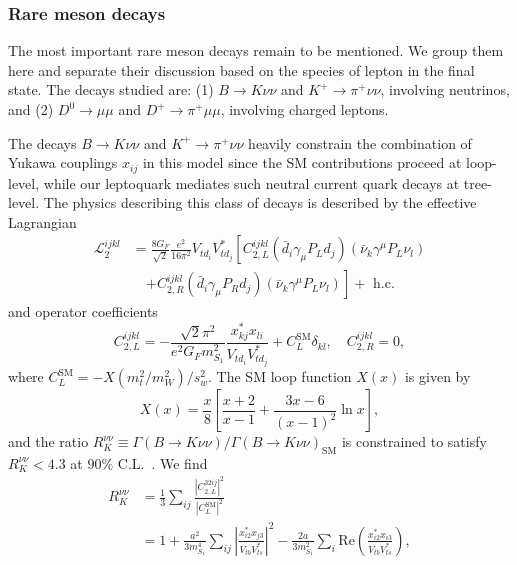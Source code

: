 \subsubsection{Rare meson decays}
\label{sec:ch3-raremesondecays}

The most important rare meson decays remain to be mentioned. We group them here
and separate their discussion based on the species of lepton in the final state.
The decays studied are: (1) $B \to K \nu \nu$ and $K^+ \to \pi^+ \nu \nu$,
involving neutrinos, and (2) $D^0 \to \mu \mu$ and $D^+ \to \pi^+ \mu \mu$,
involving charged leptons.

The decays $B \rightarrow K \nu \nu$ and $K^+ \rightarrow \pi^+ \nu \nu$ heavily
constrain the combination of Yukawa couplings $x_{ij}$ in this model since the
SM contributions proceed at loop-level, while our leptoquark mediates such
neutral current quark decays at tree-level. The physics describing this class of
decays is described by the effective Lagrangian~\cite{Altmannshofer:2009ma,
  Buras:2004uu}
\begin{equation}
  \begin{split}
    \mathscr{L}_2^{i j k l}
    &= \frac{8 G_F}{\sqrt{2}} \frac{e^2}{16 \pi^2} V_{t d_i} V^*_{t d_j} \left[ C^{ijkl}_{2,L} (\bar{d}_i \gamma_\mu P_{L} d_j)(\bar{\nu}_k
      \gamma^\mu P_L \nu_l) \right. \\ &\quad \left. + C^{ijkl}_{2,R} (\bar{d}_i \gamma_\mu P_{R} d_j)(\bar{\nu}_k
      \gamma^\mu P_L \nu_l) \right] + \text{ h.c.}
  \end{split}
\end{equation}
and operator coefficients
\begin{equation}
  C_{2,L}^{ijkl} = -\frac{\sqrt{2}\pi^2}{e^2 G_F m_{S_{1}}^2}\frac{x^*_{k j} x_{l i}}{V_{t d_i}V_{t d_j}^*} + C_L^{\text{SM}}\delta_{kl}, \quad C_{2,R}^{ijkl} = 0,
\end{equation}
where $C_L^{\text{SM}} = -X(m_t^2/m_W^2)/s_w^2$. The SM loop function $X(x)$ is
given by~\cite{Buras:2004uu, Altmannshofer:2009ma, Buchalla:1998ba,
  Misiak:1999yg}
\begin{equation}
  X(x) = \frac{x}{8} \left[ \frac{x+2}{x-1} + \frac{3x-6}{(x-1)^2} \ln x \right],
\end{equation}
and the ratio $R_{K}^{\nu\nu} \equiv \Gamma(B\rightarrow K \nu
\nu)/\Gamma(B\rightarrow K \nu \nu)_{\text{SM}}$ is constrained to satisfy
$R_K^{\nu\nu} < 4.3$ at $90\%$ C.L.~\cite{Buras:2014fpa}. We find
\begin{equation} \label{eq:ch3-rknunu}
  \begin{split}
    R_K^{\nu\nu} &= \frac{1}{3}\sum_{ij}\frac{|C_{2,L}^{32ij} |^2 }{|C_L^{\text{SM}}|^2}\\
    &= 1 + \frac{a^2}{3m_{S_{1}}^4}\sum_{ij}\left|\frac{x^*_{i 2} x_{j 3}}{V_{tb}
        V^*_{ts}}\right|^2 - \frac{2a}{3m_{S_{1}}^2} \sum_i \text{Re} \left(\frac{x^*_{i
        2} x_{i 3}}{V_{tb} V^*_{ts}}\right),
  \end{split}
\end{equation}
